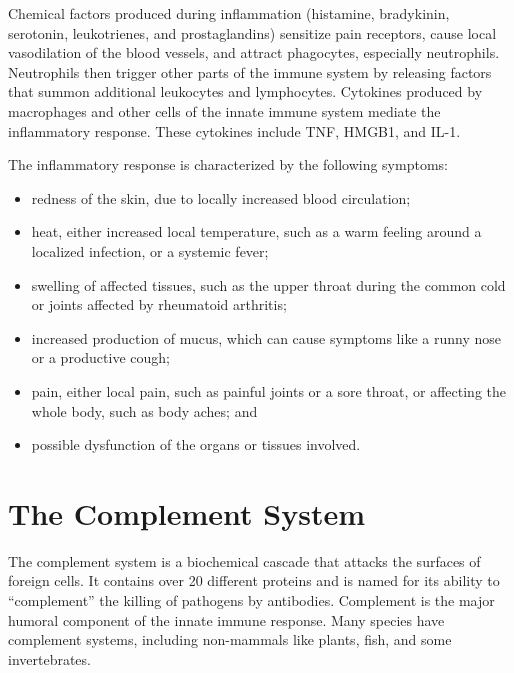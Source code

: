 Chemical factors produced during inflammation (histamine, bradykinin, serotonin, leukotrienes, and prostaglandins) sensitize pain receptors, cause local vasodilation of the blood vessels, and attract phagocytes, especially neutrophils. Neutrophils then trigger other parts of the immune system by releasing factors that summon additional leukocytes and lymphocytes. Cytokines produced by macrophages and other cells of the innate immune system mediate the inflammatory response. These cytokines include TNF, HMGB1, and IL-1.

The inflammatory response is characterized by the following symptoms:

\begin{itemize}
\tightlist
\item
  redness of the skin, due to locally increased blood circulation;
\item
  heat, either increased local temperature, such as a warm feeling around a localized infection, or a systemic fever;
\item
  swelling of affected tissues, such as the upper throat during the common cold or joints affected by rheumatoid arthritis;
\item
  increased production of mucus, which can cause symptoms like a runny nose or a productive cough;
\item
  pain, either local pain, such as painful joints or a sore throat, or affecting the whole body, such as body aches; and
\item
  possible dysfunction of the organs or tissues involved.
\end{itemize}

\hypertarget{the-complement-system}{%
\section{The Complement System}\label{the-complement-system}}

The complement system is a biochemical cascade that attacks the surfaces of foreign cells. It contains over 20 different proteins and is named for its ability to ``complement'' the killing of pathogens by antibodies. Complement is the major humoral component of the innate immune response. Many species have complement systems, including non-mammals like plants, fish, and some invertebrates.



